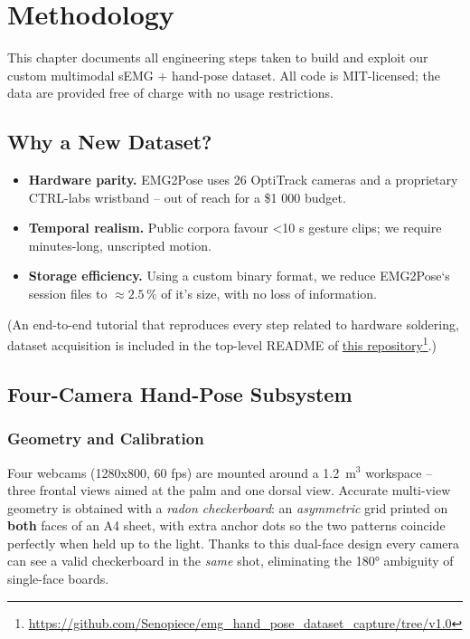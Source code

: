 \chapter{Methodology}
\label{chap:met}

This chapter documents all engineering steps taken to build and exploit our custom multimodal sEMG + hand-pose dataset. All code is MIT-licensed; the data are provided free of charge with no usage restrictions.

\section{Why a New Dataset?}

\begin{itemize}
  \item \textbf{Hardware parity.} EMG2Pose uses 26 OptiTrack cameras and a
        proprietary CTRL-labs wristband -- out of reach for a \$1 000 budget.
  \item \textbf{Temporal realism.} Public corpora favour <10 s gesture clips;
        we require minutes-long, unscripted motion.
  \item \textbf{Storage efficiency.} Using a custom binary format, we
        reduce EMG2Pose`s session files to $\approx2.5\,\%$ of it's size, with no loss of
        information.
\end{itemize}

(An end-to-end tutorial that reproduces every step related to hardware soldering, dataset acquisition is included in the top-level README of \href{https://github.com/Senopiece/emg_hand_pose_dataset_capture/tree/v1.0}{this repository}\footnote{\url{https://github.com/Senopiece/emg_hand_pose_dataset_capture/tree/v1.0}}.)

\section{Four-Camera Hand-Pose Subsystem}

\subsection{Geometry and Calibration}

Four webcams (1280x800, 60 fps) are mounted around a \SI{1.2}{\metre}$^{3}$ workspace -- three frontal views aimed at the palm and one dorsal view. Accurate multi-view geometry is obtained with a \textit{radon checkerboard}: an \emph{asymmetric} grid printed on \textbf{both} faces of an A4 sheet, with extra anchor dots so the two patterns coincide perfectly when held up to the light. Thanks to this dual-face design every camera can see a valid checkerboard in the \emph{same} shot, eliminating the 180° ambiguity of single-face boards.

